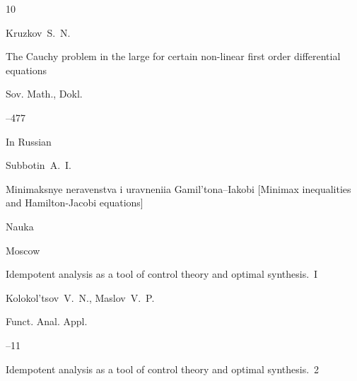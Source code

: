 \begin{thebibliography}{10}







\by Kruzkov~S.~N.

\paper The Cauchy problem in the large for certain non-linear first order differential equations


\jour Sov. Math., Dokl.


--477 









\lang In Russian

\by Subbotin~A.~I.

\book Minimaksnye neravenstva i uravneniia Gamil'tona--Iakobi \rm [Minimax inequalities and Hamilton-Jacobi equations]


\publ Nauka

\publaddr Moscow





\paper Idempotent analysis as a tool of control theory and optimal synthesis.~I

\by  Kolokol'tsov~V.~N.,  Maslov~V.~P.



\jour Funct. Anal. Appl.




--11






\paper Idempotent analysis as a tool of control theory and optimal synthesis.~2


\end{thebibliography}
